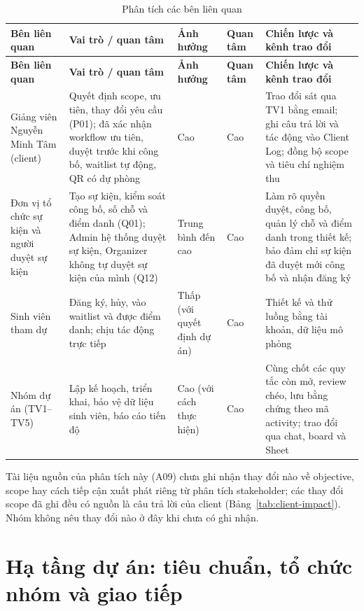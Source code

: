 \begingroup\tblsetup\tblzebra
\begin{longtable}{L{2.4cm}L{3.2cm}L{1.9cm}L{1.3cm}L{5.2cm}}
\caption{Phân tích các bên liên quan}\label{tab:stakeholder}\\
\toprule
{}\textbf{Bên liên quan} & \textbf{Vai trò / quan tâm} & \textbf{Ảnh hưởng} & \textbf{Quan tâm} & \textbf{Chiến lược và kênh trao đổi} \\
\midrule
\endfirsthead
\toprule
{}\textbf{Bên liên quan} & \textbf{Vai trò / quan tâm} & \textbf{Ảnh hưởng} & \textbf{Quan tâm} & \textbf{Chiến lược và kênh trao đổi} \\
\midrule
\endhead
\bottomrule
\endlastfoot
Giảng viên Nguyễn Minh Tâm (client) & Quyết định scope, ưu tiên, thay đổi yêu cầu (P01); đã xác nhận workflow ưu tiên, duyệt trước khi công bố, waitlist tự động, QR có dự phòng & Cao & Cao & Trao đổi sát qua TV1 bằng email; ghi câu trả lời và tác động vào Client Log; đồng bộ scope và tiêu chí nghiệm thu \\
Đơn vị tổ chức sự kiện và người duyệt sự kiện & Tạo sự kiện, kiểm soát công bố, số chỗ và điểm danh (Q01); Admin hệ thống duyệt sự kiện, Organizer không tự duyệt sự kiện của mình (Q12) & Trung bình đến cao & Cao & Làm rõ quyền duyệt, công bố, quản lý chỗ và điểm danh trong thiết kế; bảo đảm chỉ sự kiện đã duyệt mới công bố và nhận đăng ký \\
Sinh viên tham dự & Đăng ký, hủy, vào waitlist và được điểm danh; chịu tác động trực tiếp & Thấp (với quyết định dự án) & Cao & Thiết kế và thử luồng bằng tài khoản, dữ liệu mô phỏng \\
Nhóm dự án (TV1--TV5) & Lập kế hoạch, triển khai, bảo vệ dữ liệu sinh viên, báo cáo tiến độ & Cao (với cách thực hiện) & Cao & Cùng chốt các quy tắc còn mở, review chéo, lưu bằng chứng theo mã activity; trao đổi qua chat, board và Sheet \\
\end{longtable}
\endgroup

Tài liệu nguồn của phân tích này (A09) chưa ghi nhận thay đổi nào về objective, scope hay cách tiếp cận xuất phát riêng từ phân tích stakeholder; các thay đổi scope đã ghi đều có nguồn là câu trả lời của client (Bảng~\ref{tab:client-impact}). Nhóm không nêu thay đổi nào ở đây khi chưa có ghi nhận.

\section{Hạ tầng dự án: tiêu chuẩn, tổ chức nhóm và giao tiếp}
\label{sec:1-7}

